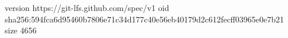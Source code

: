 version https://git-lfs.github.com/spec/v1
oid sha256:594fca6d95460b7806e71c34d177c40e56eb40179d2c612fecff03965e0e7b21
size 4656
